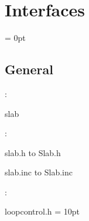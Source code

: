
\section{Interfaces} 


\parskip = 0pt

\vspace{3mm} \subsection*{General}

: 

slab
\vspace{2mm}

\vspace{5mm}

: 



slab.h to Slab.h

slab.inc to Slab.inc
\vspace{2mm}

: 

loopcontrol.h
\vspace{2mm}\parskip = 10pt 
